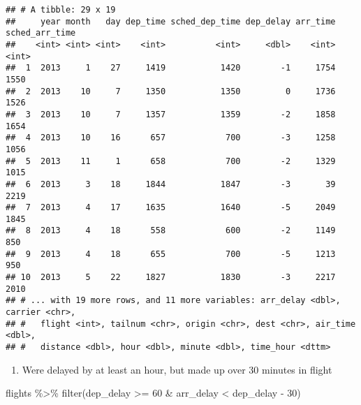 \documentclass[
]{article}
\newenvironment{Shaded}{\begin{snugshade}}{\end{snugshade}}
\newcommand{\DecValTok}[1]{\textcolor[rgb]{0.00,0.00,0.81}{#1}}
\newcommand{\FunctionTok}[1]{\textcolor[rgb]{0.00,0.00,0.00}{#1}}
\newcommand{\NormalTok}[1]{#1}
\newcommand{\SpecialCharTok}[1]{\textcolor[rgb]{0.00,0.00,0.00}{#1}}
\providecommand{\tightlist}{%
  \setlength{\itemsep}{0pt}\setlength{\parskip}{0pt}}
\begin{document}
\begin{verbatim}
## # A tibble: 29 x 19
##     year month   day dep_time sched_dep_time dep_delay arr_time sched_arr_time
##    <int> <int> <int>    <int>          <int>     <dbl>    <int>          <int>
##  1  2013     1    27     1419           1420        -1     1754           1550
##  2  2013    10     7     1350           1350         0     1736           1526
##  3  2013    10     7     1357           1359        -2     1858           1654
##  4  2013    10    16      657            700        -3     1258           1056
##  5  2013    11     1      658            700        -2     1329           1015
##  6  2013     3    18     1844           1847        -3       39           2219
##  7  2013     4    17     1635           1640        -5     2049           1845
##  8  2013     4    18      558            600        -2     1149            850
##  9  2013     4    18      655            700        -5     1213            950
## 10  2013     5    22     1827           1830        -3     2217           2010
## # ... with 19 more rows, and 11 more variables: arr_delay <dbl>, carrier <chr>,
## #   flight <int>, tailnum <chr>, origin <chr>, dest <chr>, air_time <dbl>,
## #   distance <dbl>, hour <dbl>, minute <dbl>, time_hour <dttm>
\end{verbatim}

\begin{enumerate}
\def\labelenumi{\arabic{enumi}.}
\setcounter{enumi}{5}
\tightlist
\item
  Were delayed by at least an hour, but made up over 30 minutes in
  flight
\end{enumerate}

\begin{Shaded}
\begin{Highlighting}[]
\NormalTok{flights }\SpecialCharTok{\%\textgreater{}\%} \FunctionTok{filter}\NormalTok{(dep\_delay }\SpecialCharTok{\textgreater{}=} \DecValTok{60} \SpecialCharTok{\&}\NormalTok{ arr\_delay }\SpecialCharTok{\textless{}}\NormalTok{ dep\_delay }\SpecialCharTok{{-}} \DecValTok{30}\NormalTok{)}
\end{Highlighting}
\end{Shaded}
\end{document}
